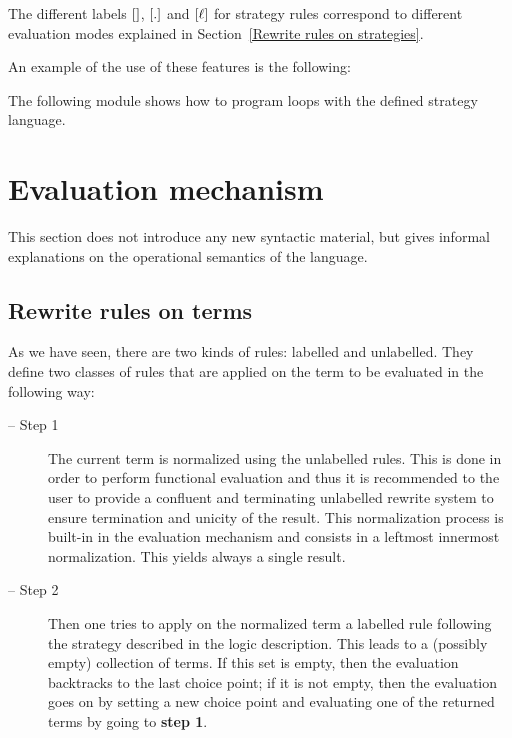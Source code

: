 \noindent The different labels ${\Large\bf []}$, ${\Large\bf [.]}$ and ${\Large\bf [\ell]}$
for strategy rules correspond to different evaluation modes
explained in Section~\ref{Rewrite rules on strategies}.

\EX

An example of the use of these features is the following:

\FEX

\EX
The following module shows how to program loops with the defined
strategy language.



\FEX


\section{Evaluation mechanism}\label{Evaluation mechanism}

This section does not introduce any new syntactic material, but gives
informal explanations on the operational semantics of the
language.

\subsection{Rewrite rules on terms}

As we have seen, there are two kinds of rules: labelled and
unlabelled. They define two classes of rules that are applied on the
term to be evaluated in the following way:

\begin{description}
\item[-- Step  1] The current term is  normalized using the unlabelled
        rules. This is done  in order to perform functional evaluation
        and thus it is recommended to the  user to provide a confluent
        and   terminating   unlabelled   rewrite   system   to  ensure
        termination and  unicity  of  the result.   This normalization
        process is built-in in  the evaluation mechanism  and consists
        in a leftmost innermost  normalization.  This yields always  a
        single result.
\item[-- Step 2] Then one tries to apply on the normalized term a labelled rule
        following the strategy described in the logic
        description. This leads to a (possibly empty) collection of terms. If
        this set is empty, then the evaluation backtracks to the last
        choice point; if it is not empty, then the evaluation goes on
        by setting a new choice point and evaluating one of the returned
        terms by going to {\bf step 1}.
\end{description}

